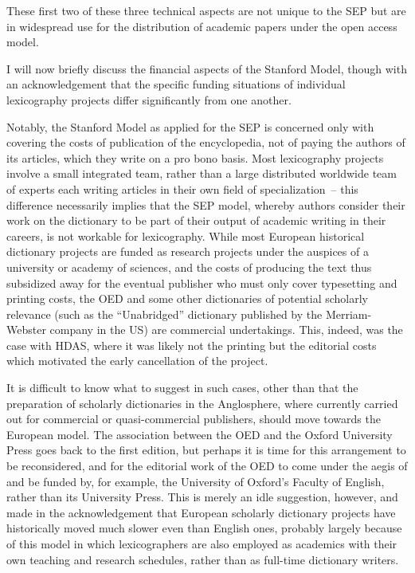\documentclass[output=paper]{langscibook}
\begin{document}
These first two of these three technical aspects are not unique to the
SEP but are in widespread use for the distribution of academic
papers under the open access model.

I will now briefly discuss the financial aspects of the Stanford Model,
though with an acknowledgement that the specific funding situations of
individual lexicography projects differ significantly from one another.

Notably, the Stanford Model as applied for the SEP is concerned
only with covering the costs of publication of the encyclopedia, not of
paying the authors of its articles, which they write on a pro bono
basis. Most lexicography projects involve a small integrated team,
rather than a large distributed worldwide team of experts each writing
articles in their own field of specialization~-- this difference
necessarily implies that the SEP model, whereby authors consider
their work on the dictionary to be part of their output of academic
writing in their careers, is not workable for lexicography. While most
European historical dictionary projects are funded as research projects
under the auspices of a university or academy of sciences, and the costs
of producing the text thus subsidized away for the eventual publisher
who must only cover typesetting and printing costs, the OED and
some other dictionaries of potential scholarly relevance (such as the
“Unabridged” dictionary published by the Merriam-Webster company in the
US) are commercial undertakings. This, indeed, was the case with
HDAS, where it was likely not the printing but the editorial
costs which motivated the early cancellation of the project.

It is difficult to know what to suggest in such cases, other than that
the preparation of scholarly dictionaries in the Anglosphere, where
currently carried out for commercial or quasi-commercial publishers,
should move towards the European model. The association between the OED and the Oxford University Press goes back to the first
edition, but perhaps it is time for this arrangement to be reconsidered,
and for the editorial work of the OED to come under the aegis of
and be funded by, for example, the University of Oxford's Faculty of
English, rather than its University Press. This is merely an idle
suggestion, however, and made in the acknowledgement that European
scholarly dictionary projects have historically moved much slower even
than English ones, probably largely because of this model in which
lexicographers are also employed as academics with their own teaching
and research schedules, rather than as full-time dictionary writers.
\end{document}
